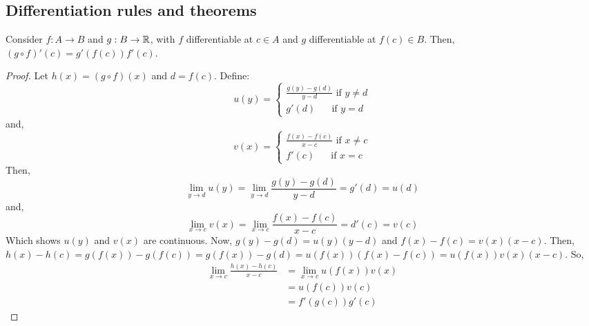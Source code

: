 \subsection{Differentiation rules and theorems}

\begin{theorem}
    Consider $f: A \to B$ and $g: B \to \mathbb{R}$, with $f$ differentiable at $c \in A$ and $g$ differentiable at $f(c) \in B$. Then, $(g \circ f)'(c) = g'(f(c))f'(c)$.
\end{theorem}

\begin{proof}
    Let $h(x) = (g \circ f)(x)$ and $d = f(c)$. Define:
    \begin{equation*}
        u(y) = \begin{cases}
            \frac{g(y) - g(d)}{y - d} \text{ if } y \neq d \\
            g'(d) \: \: \: \: \: \: \text{ if } y = d
        \end{cases}
    \end{equation*}
    and,
    \begin{equation*}
        v(x) = \begin{cases}
            \frac{f(x) - f(c)}{x - c} \text{ if } x \neq c \\
            f'(c) \: \: \: \: \: \: \text{ if } x = c
        \end{cases}
    \end{equation*}
    Then,
    \begin{equation*}
        \lim \limits_{y \to d} u(y) = \lim \limits_{y \to d} \frac{g(y) - g(d)}{y - d} = g'(d) = u(d)
    \end{equation*}
    and,
    \begin{equation*}
        \lim \limits_{x \to c} v(x) = \lim \limits_{x \to c} \frac{f(x) - f(c)}{x - c} = d'(c) = v(c)
    \end{equation*}
    Which shows $u(y)$ and $v(x)$ are continuous. Now, $g(y) - g(d) = u(y)(y-d)$ and $f(x) - f(c) = v(x)(x-c)$. Then, $h(x) - h(c) = g(f(x)) - g(f(c)) = g(f(x)) - g(d) = u(f(x))(f(x) - f(c)) = u(f(x))v(x)(x-c)$. So, 
    \begin{align*}
        \lim \limits_{x \to c} \frac{h(x) - h(c)}{x - c} &= \lim \limits_{x \to c} u(f(x))v(x) \\
        &= u(f(c))v(c) \\
        &= f'(g(c))g'(c)
    \end{align*}
\end{proof}


